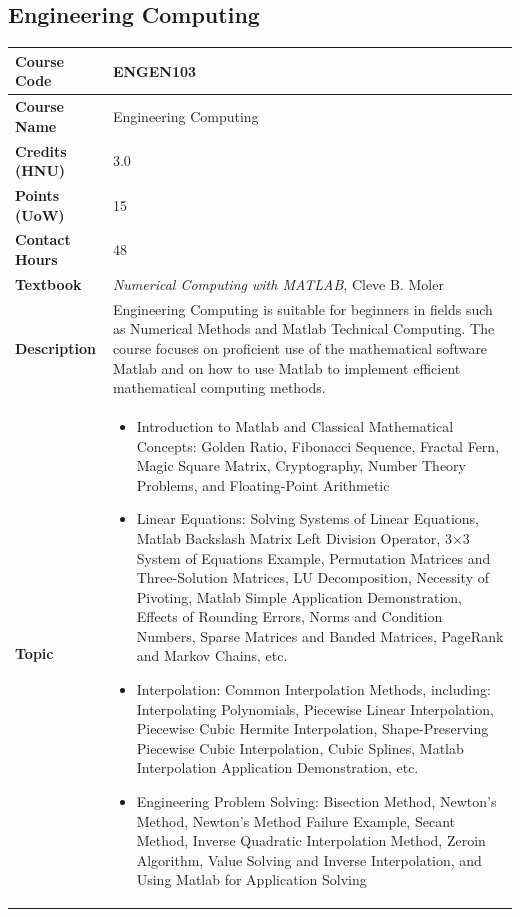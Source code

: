 \documentclass{article}
\begin{document}
\subsection[ENGEN103 Engineering Computing]{Engineering Computing}
\renewcommand{\arraystretch}{1.5} %
\begin{longtable}{|p{3cm}|p{10cm}|}
\hline
\textbf{Course Code} & ENGEN103 \\
\hline
\textbf{Course Name} & Engineering Computing \\
\hline
\textbf{Credits (HNU)} & 3.0 \\
\hline
\textbf{Points (UoW)} & 15 \\
\hline
\textbf{Contact Hours} & 48 \\
\hline
\textbf{Textbook} & \emph{Numerical Computing with MATLAB}, Cleve B. Moler\\
\hline
\textbf{Description} & Engineering Computing is suitable for beginners in fields such as Numerical Methods and Matlab Technical Computing. The course focuses on proficient use of the mathematical software Matlab and on how to use Matlab to implement efficient mathematical computing methods.\\
\hline
\textbf{Topic} & 
\begin{itemize}
    \item Introduction to Matlab and Classical Mathematical Concepts: Golden Ratio, Fibonacci Sequence, Fractal Fern, Magic Square Matrix, Cryptography, Number Theory Problems, and Floating-Point Arithmetic
    \item Linear Equations: Solving Systems of Linear Equations, Matlab Backslash Matrix Left Division Operator, 3×3 System of Equations Example, Permutation Matrices and Three-Solution Matrices, LU Decomposition, Necessity of Pivoting, Matlab Simple Application Demonstration, Effects of Rounding Errors, Norms and Condition Numbers, Sparse Matrices and Banded Matrices, PageRank and Markov Chains, etc.
    \item Interpolation: Common Interpolation Methods, including: Interpolating Polynomials, Piecewise Linear Interpolation, Piecewise Cubic Hermite Interpolation, Shape-Preserving Piecewise Cubic Interpolation, Cubic Splines, Matlab Interpolation Application Demonstration, etc.
    \item Engineering Problem Solving: Bisection Method, Newton's Method, Newton's Method Failure Example, Secant Method, Inverse Quadratic Interpolation Method, Zeroin Algorithm, Value Solving and Inverse Interpolation, and Using Matlab for Application Solving

\end{itemize}
\end{longtable}
\end{document}
